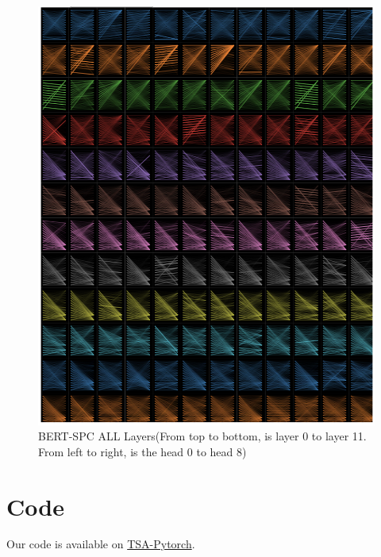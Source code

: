 \documentclass[fyp]{socreport}
\begin{document}
\begin{figure}[h]
    \centering
    \includegraphics[width=\linewidth]{./image/spc_all.png}
    \caption{BERT-SPC ALL Layers(From top to bottom, is layer 0 to layer 11. From left to right, is the head 0 to head 8)}
  \label{spc_all}
\end{figure}






\chapter{Code}
Our code is available on \href{https://github.com/Xiang-Pan/TSA-PyTorch}{TSA-Pytorch}.
\end{document}
